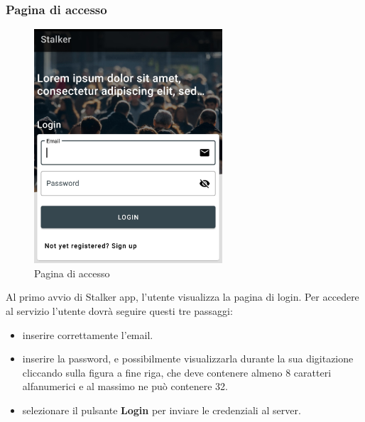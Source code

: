 \documentclass[../manuale-utente.tex]{subfiles}
\begin{document}
\subsubsection{Pagina di accesso}%
\label{sub:pagina_di_accesso}

\begin{figure}[H]
    \centering
    \includegraphics[width=70mm]{img/mobile-app/pagina-di-accesso.jpg}
    \caption{Pagina di accesso}%
    \label{fig:mobile_app_pagina_di_accesso}
\end{figure}

Al primo avvio di Stalker app, l'utente visualizza la pagina di login. 
Per accedere al servizio l'utente dovrà seguire questi tre passaggi:
\begin{itemize}
    \item inserire correttamente l'email.
    \item inserire la password, e possibilmente visualizzarla durante la sua digitazione cliccando sulla figura a fine riga, che deve contenere almeno 8 caratteri alfanumerici e al massimo ne può contenere 32.
    \item selezionare il pulsante \textbf{Login} per inviare le credenziali al server.
\end{itemize} 
\end{document}
